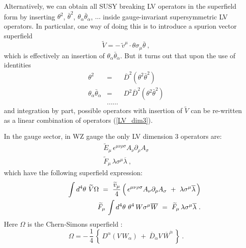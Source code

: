 \documentclass[12pt]{revtex4}
\begin{document}
Alternatively, we can obtain 
all SUSY breaking LV operators in the superfield form by
inserting  $ \theta^2 $, 
$ \bar{\theta}^2 $, 
$ \theta_\alpha \bar{\theta}_{\dot\alpha} $, 
$ \dots $ inside
gauge-invariant supersymmetric LV operators.
In particular, one way of doing this 
\cite{GrootNibbelink:2004za}
is to introduce a spurion vector superfield
\[
\widetilde{V} = -\, \widetilde{v}^\mu \cdot 
\theta \sigma_\mu \bar{\theta}~,
\]
which is effectively an insertion of 
$ \theta_\alpha \bar{\theta}_{\dot\alpha} $.
But it turns out that upon the use of identities
\begin{eqnarray*}
\theta^2 & = & \overline{D}^2 ( \theta^2 \bar{\theta}^2 ) \\
\theta_\alpha \bar{\theta}_{\dot\alpha} & = &
D^2 \overline{D}^2 ( \theta^2 \bar{\theta}^2 ) \\
         & \ldots\ldots &
\end{eqnarray*}
and integration by part, possible operators with insertion of $\widetilde V$ can 
be re-written as a linear combination 
 of operators (\ref{LV_dim3}).

In the gauge sector, in WZ gauge the only LV dimension 3 
operators are:
\begin{eqnarray}
\nonumber
& 
\widetilde{E}_\mu\, \epsilon^{\mu\nu\rho\sigma}
A_\nu \partial_\rho A_\sigma  &\\
\nonumber
&
\widetilde{F}_\mu\, \lambda \sigma^\mu \overline{\lambda} 
~, &
\end{eqnarray}
which have the following superfield expression:
\begin{eqnarray*}
\label{CSint}
&&
\phantom{\widetilde{F}_\mu\,}
\int d^4\theta~ \widetilde{V} \Omega 
~ = ~
   \frac{\widetilde{v}_\mu}{4}\,
\Bigl(\, 
\epsilon^{\mu\nu\rho\sigma}
A_\nu \partial_\rho A_\sigma
~+~
\lambda \sigma^\mu \overline{\lambda}
        \,
\Bigr) \\
&&
\widetilde{F}_\mu\, \int d^4\theta~ \theta^4\, 
W \sigma^\mu \overline{W} 
~ = ~
\widetilde{F}_\mu\, \lambda \sigma^\mu \overline{\lambda}~.
\end{eqnarray*}
Here $ \Omega $ is the Chern-Simons superfield
\cite{Cecotti:1987nw}:
\[
\Omega = -\, \frac{1}{4}\,
\left\{\, 
D^\alpha (V\, W_\alpha) 
~+~
\overline{D}_{\dot\alpha}V\,
\overline{W}^{\dot\alpha}
\,
\right\}~.
\]
\end{document}
